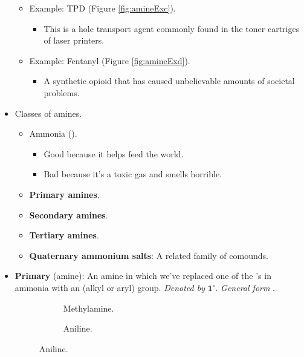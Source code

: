 \documentclass[../notes.tex]{subfiles}
\begin{document}
\begin{itemize}
\begin{itemize}
\begin{itemize}
        \end{itemize}
        \item Example: TPD (Figure \ref{fig:amineExc}).
        \begin{itemize}
            \item This is a hole transport agent commonly found in the toner cartriges of laser printers.
        \end{itemize}
        \item Example: Fentanyl (Figure \ref{fig:amineExd}).
        \begin{itemize}
            \item A synthetic opioid that has caused unbelievable amounts of societal problems.
        \end{itemize}
    \end{itemize}
    \item Classes of amines.
    \begin{itemize}
        \item Ammonia ().
        \begin{itemize}
            \item Good because it helps feed the world.
            \item Bad because it's a toxic gas and smells horrible.
        \end{itemize}
        \item \textbf{Primary amines}.
        \item \textbf{Secondary amines}.
        \item \textbf{Tertiary amines}.
        \item \textbf{Quaternary ammonium salts}: A related family of comounds.
    \end{itemize}
    \pagebreak
    \item \textbf{Primary} (amine): An amine in which we've replaced one of the 's in ammonia with an (alkyl or aryl)  group. \emph{Denoted by} $\bm{1^\circ}$. \emph{General form} .
    \begin{figure}[h!]
        \centering
        \footnotesize
        \begin{subfigure}[b]{0.2\linewidth}
            \centering
            \caption{Methylamine.}
            \label{fig:amineEx1a}
        \end{subfigure}
        \begin{subfigure}[b]{0.2\linewidth}
            \centering
            \caption{Aniline.}

\end{subfigure}
\end{figure}
\end{itemize}
\end{document}
